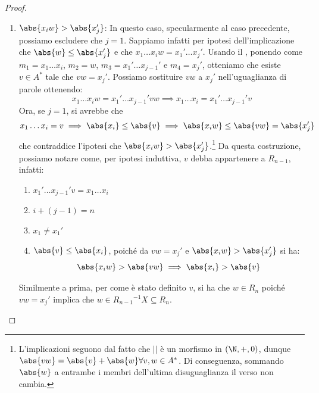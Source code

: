 \begin{proof}
\begin{description}
\begin{enumerate}
          Ciò ci permette di porre \(r_{n-1} = x_{i}w\). Dall'ipotesi induttiva, sappiamo che \(r_{n-1} \in R_{n-1}\), poiché:
          \begin{enumerate}
            \item \(x_1\ldots x_{i-1}r_{n-1} = x_1'\ldots x_j'\), sostituendo \(r_{n-1}\) a \(x_{i}w\)
            \item \(i-1+j=n\)
            \item \(x_1 \neq x_1'\)
            \item \(\abs{r_{n-1}} = \abs{x_i w} \leq \abs{x_j'}\)
          \end{enumerate}
          Ma per com'è stato definito \(r_{n-1}\), si ha che \(w \in R_n\) poiché \(x_{i} w = r_{n-1}\) implica che \(w \in X^{-1} R_{n-1} \subseteq R_n\).
        \item \(\abs{x_{i}w} > \abs{x_j'}\):
          In questo caso, specularmente al caso precedente, possiamo escludere che \(j=1\).
          Sappiamo infatti per ipotesi dell'implicazione che \(\abs{w} \leq \abs{x_j'}\) e che \(x_1\ldots x_i w = x_1'\ldots x_j'\). Usando il , ponendo come \(m_1 = x_1\ldots x_i\), \(m_2 = w\), \(m_3 = x_1'\ldots x_{j-1}'\) e \(m_4 = x_j'\), otteniamo che esiste \(v \in A^*\) tale che \(vw=x_j'\).
          Possiamo sostituire \(vw\) a \(x_j'\) nell'uguaglianza di parole ottenendo:
          \[x_1\ldots x_i w = x_1'\ldots x_{j-1}' vw \implies x_1\ldots x_i = x_1'\ldots x_{j-1}' v \]
          Ora, se \(j=1\), si avrebbe che 
            \[x_1\ldots x_i = v \implies \abs{x_i} \leq \abs{v} \implies \abs{x_i w} \leq \abs{vw} = \abs{x_j'} \]
          che contraddice l'ipotesi che \(\abs{x_{i}w} > \abs{x_j'}\).\footnote{L'implicazioni seguono dal fatto che \(||\) è un morfismo in \((\N,+,0)\), dunque \(\abs{vw} = \abs{v}+\abs{w} \forall v,w \in A^*\). Di conseguenza, sommando \(\abs{w}\) a entrambe i membri dell'ultima disuguaglianza il verso non cambia.}
          Da questa costruzione, possiamo notare come, per ipotesi induttiva, \(v\) debba appartenere a \(R_{n-1}\), infatti:
          \begin{enumerate}
            \item \(x_1'\ldots x_{j-1}' v = x_1\ldots x_i\)
            \item \(i + (j-1) = n\)
            \item \(x_1 \neq x_1'\)
            \item \(\abs{v} \leq \abs{x_i}\), poiché da \(vw = x_j'\) e \(\abs{x_{i}w} > \abs{x_j'}\) si ha:
            \[\abs{x_{i}w}  > \abs{vw} \implies \abs{x_{i}} > \abs{v}\]
        \end{enumerate}
        Similmente a prima, per come è stato definito \(v\), si ha che \(w \in R_n\) poiché \(vw = x_j'\) implica che \(w \in {R_{n-1}}^{-1} X \subseteq R_n\).
      \end{enumerate}
  \end{description}
\end{proof}

